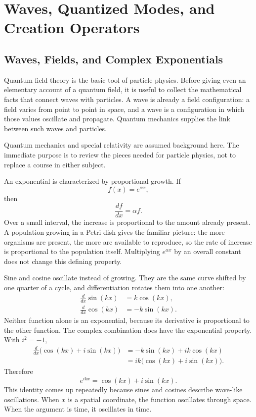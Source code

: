 \chapter{Waves, Quantized Modes, and Creation Operators}

\section{Waves, Fields, and Complex Exponentials}

Quantum field theory is the basic tool of particle physics. Before giving even an elementary account of a quantum field, it is useful to collect the mathematical facts that connect waves with particles. A wave is already a field configuration: a field varies from point to point in space, and a wave is a configuration in which those values oscillate and propagate. Quantum mechanics supplies the link between such waves and particles.

Quantum mechanics and special relativity are assumed background here. The immediate purpose is to review the pieces needed for particle physics, not to replace a course in either subject.

An exponential is characterized by proportional growth. If
\begin{equation}
f(x)=e^{\alpha x},
\end{equation}
then
\begin{equation}
\frac{df}{dx}=\alpha f.
\end{equation}
Over a small interval, the increase is proportional to the amount already present. A population growing in a Petri dish gives the familiar picture: the more organisms are present, the more are available to reproduce, so the rate of increase is proportional to the population itself. Multiplying \(e^{\alpha x}\) by an overall constant does not change this defining property.

Sine and cosine oscillate instead of growing. They are the same curve shifted by one quarter of a cycle, and differentiation rotates them into one another:
\begin{align}
\frac{d}{dx}\sin(kx)&=k\cos(kx),\\
\frac{d}{dx}\cos(kx)&=-k\sin(kx).
\end{align}
Neither function alone is an exponential, because its derivative is proportional to the other function. The complex combination does have the exponential property. With \(i^2=-1\),
\begin{align}
\frac{d}{dx}\bigl(\cos(kx)+i\sin(kx)\bigr)
&=-k\sin(kx)+ik\cos(kx)\\
&=ik\bigl(\cos(kx)+i\sin(kx)\bigr).
\end{align}
Therefore
\begin{equation}
e^{ikx}=\cos(kx)+i\sin(kx).
\end{equation}
This identity comes up repeatedly because sines and cosines describe wave-like oscillations. When \(x\) is a spatial coordinate, the function oscillates through space. When the argument is time, it oscillates in time.

